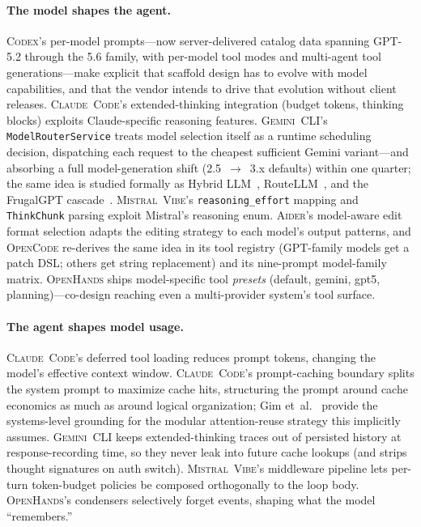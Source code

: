 \documentclass[11pt,a4paper]{article}
\newcommand{\clcode}{\textsc{Claude~Code}\xspace}
\newcommand{\cdx}{\textsc{Codex}\xspace}
\newcommand{\oh}{\textsc{OpenHands}\xspace}
\newcommand{\adr}{\textsc{Aider}\xspace}
\newcommand{\vibe}{\textsc{Mistral~Vibe}\xspace}
\newcommand{\gemini}{\textsc{Gemini~CLI}\xspace}
\newcommand{\ocd}{\textsc{OpenCode}\xspace}
\begin{document}
\paragraph{The model shapes the agent.}
\cdx{}'s per-model prompts---now server-delivered catalog data spanning GPT-5.2 through the 5.6 family, with per-model tool modes and multi-agent tool generations---make explicit that scaffold design has to evolve with model capabilities, and that the vendor intends to drive that evolution without client releases.
\clcode{}'s extended-thinking integration (budget tokens, thinking blocks) exploits Claude-specific reasoning features.
\gemini{}'s \texttt{ModelRouterService} treats model selection itself as a runtime scheduling decision, dispatching each request to the cheapest sufficient Gemini variant---and absorbing a full model-generation shift (2.5~$\to$~3.x defaults) within one quarter; the same idea is studied formally as Hybrid LLM~\cite{ding2024hybridllm}, RouteLLM~\cite{ong2025routellm}, and the FrugalGPT cascade~\cite{chen2024frugalgpt}.
\vibe{}'s \texttt{reasoning\_effort} mapping and \texttt{ThinkChunk} parsing exploit Mistral's reasoning enum.
\adr{}'s model-aware edit format selection adapts the editing strategy to each model's output patterns, and \ocd{} re-derives the same idea in its tool registry (GPT-family models get a patch DSL; others get string replacement) and its nine-prompt model-family matrix.
\oh{} ships model-specific tool \emph{presets} (default, gemini, gpt5, planning)---co-design reaching even a multi-provider system's tool surface.

\paragraph{The agent shapes model usage.}
\clcode{}'s deferred tool loading reduces prompt tokens, changing the model's effective context window.
\clcode{}'s prompt-caching boundary splits the system prompt to maximize cache hits, structuring the prompt around cache economics as much as around logical organization; Gim et~al.~\cite{gim2024promptcache} provide the systems-level grounding for the modular attention-reuse strategy this implicitly assumes.
\gemini{} keeps extended-thinking traces out of persisted history at response-recording time, so they never leak into future cache lookups (and strips thought signatures on auth switch).
\vibe{}'s middleware pipeline lets per-turn token-budget policies be composed orthogonally to the loop body.
\oh{}'s condensers selectively forget events, shaping what the model ``remembers.''
\end{document}
